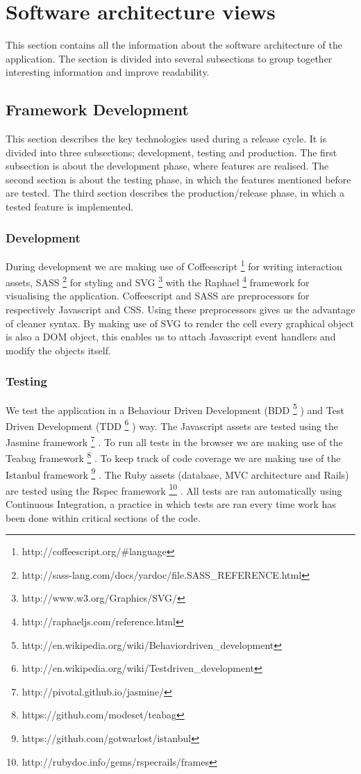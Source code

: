 \documentclass{report}
\begin{document}
			
	\clearpage
	\section{Software architecture views}
		This section contains all the information about the software architecture of the application. The section is divided into several subsections to group together interesting information and improve readability.	
		
		\subsection{Framework Development}
			This section describes the key technologies used during a release cycle.
			It is divided into three subsections; development, testing and production.
			The first subsection is about the development phase, where features are realised.
			The second section is about the testing phase, in which the features mentioned before are tested.
			The third section describes the production/release phase, in which a tested feature is implemented.
			
			\subsubsection{Development}
				During development we are making use of Coffeescript \footnote{http://coffeescript.org/\#language} for writing interaction assets, SASS \footnote{http://sass-lang.com/docs/yardoc/file.SASS\_REFERENCE.html} for styling and SVG \footnote{http://www.w3.org/Graphics/SVG/} with the Raphael \footnote{http://raphaeljs.com/reference.html} framework for visualising the application.
				Coffeescript and SASS are preprocessors for respectively Javascript and CSS. Using these preprocessors gives us the advantage of cleaner syntax.
				By making use of SVG to render the cell every graphical object is also a DOM object, this enables us to attach Javascript event handlers and modify the objects itself.
				
			\subsubsection{Testing}
				We test the application in a Behaviour Driven Development (BDD \footnote{http://en.wikipedia.org/wiki/Behavior\-driven\_development} ) and Test Driven Development (TDD \footnote{http://en.wikipedia.org/wiki/Test\-driven\_development} ) way. 
				The Javascript assets are tested using the Jasmine framework \footnote{http://pivotal.github.io/jasmine/} . 
				To run all tests in the browser we are making use of the Teabag framework \footnote{https://github.com/modeset/teabag} . 
				To keep track of code coverage we are making use of the Istanbul framework \footnote{https://github.com/gotwarlost/istanbul} .
				The Ruby assets (database, MVC architecture and Rails) are tested using the Rspec framework \footnote{http://rubydoc.info/gems/rspec\-rails/frames} .  
				All tests are ran automatically using Continuous Integration, a practice in which tests are ran every time work has been done within critical sections of the code. 
				
\end{document}

